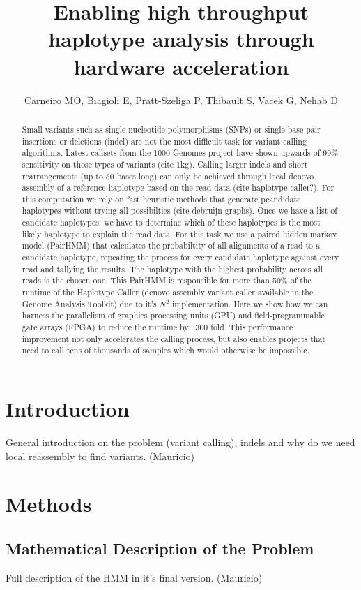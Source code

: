 \documentclass[11pt, oneside]{article}
\title{Enabling high throughput haplotype analysis through hardware acceleration}
\author{Carneiro MO, Biagioli E, Pratt-Szeliga P, Thibault S, Vacek G, Nehab D}
\begin{document}
	\maketitle
	
	\begin{abstract}
	Small variants such as single nucleotide polymorphisms (SNPs) or single base pair insertions or deletions (indel) are not the most difficult task for variant calling algorithms. Latest callsets from the 1000 Genomes project have shown upwards of 99\% sensitivity on those types of variants (cite 1kg). Calling larger indels and short rearrangements (up to 50 bases long) can only be achieved through local denovo assembly of a reference haplotype based on the read data (cite haplotype caller?). For this computation we rely on fast heuristic methods that generate pcandidate haplotypes without trying all possibilties (cite debruijn graphs). Once we have a list of candidate haplotypes, we have to determine which of these haplotypes is the most likely haplotype to explain the read data. For this task we use a paired hidden markov model (PairHMM) that calculates the probabiltity of all alignments of a read to a candidate haplotype, repeating the process for every candidate haplotype against every read and tallying the results. The haplotype with the highest probability across all reads is the chosen one. This PairHMM is responsible for more than 50\% of the runtime of the Haplotype Caller (denovo assembly variant caller available in the Genome Analysis Toolkit) due to it's $N^2$ implementation. Here we show how we can harness the parallelism of graphics processing units (GPU) and field-programmable gate arrays (FPGA) to reduce the runtime by ~300 fold. This performance improvement not only accelerates the calling process, but also enables projects that need to call tens of thousands of samples which would otherwise be impossible.
	\end{abstract}

	\section{Introduction}
	General introduction on the problem (variant calling), indels and why do we need local reassembly to find variants. (Mauricio)
	\section{Methods}
	\subsection{Mathematical Description of the Problem}
	Full description of the HMM in it's final version. (Mauricio)
\end{document}
